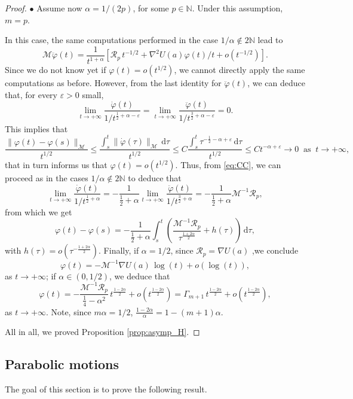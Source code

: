 \documentclass[a4paper,10pt]{amsart}
\newcommand{\ud}{\mathrm{d}}
\theoremstyle{plain}
\theoremstyle{definition}
\numberwithin{equation}{section}
\numberwithin{thm}{section}
\begin{document}
\begin{proof}
    \noindent $\bullet$  Assume now $\alpha =1/(2p)$, for some $p \in \mathbb{N}$. Under this assumption, $m=p$.

In this case, the same computations performed in the case $1/\alpha \notin 2 \mathbb{N}$ lead to
\begin{equation}
\label{eq:CC}
\mathcal M\ddot \varphi(t)=\frac{1}{t^{1+\alpha}}\left[\mathcal R_p\,t^{-1/2}+ \nabla^2 U(a)\varphi(t)/t + o(t^{-1/2})\right].
\end{equation}
Since we do not know yet if $\varphi(t)=o(t^{1/2})$, we cannot directly apply the same computations as before. However, from the last identity for $\ddot \varphi(t)$, we can deduce that, for every $\varepsilon>0$ small,
\[
\lim_{t \rightarrow+\infty} \frac{\dot \varphi(t)}{1/t^{\frac12+\alpha-\varepsilon}}=\lim_{t \rightarrow+\infty}\frac{\ddot \varphi(t)}{1/t^{\frac32+\alpha-\varepsilon}}=0.
\]
This implies that 
\[
\frac{\|\varphi(t)-\varphi(s)\|_\mathcal{M}}{t^{1/2}}\le \frac{\int_s^t \|\dot \varphi(\tau)\|_\mathcal{M}\,\ud\tau}{t^{1/2}} \le C \frac{\int_s^t \tau^{-\frac12-\alpha+\varepsilon}\,\ud\tau}{t^{1/2}}    \le C t^{-\alpha+\varepsilon} \to 0 \ \mbox{ as } \ t \rightarrow+\infty,
\]
that in turn informs us that $\varphi(t)=o(t^{1/2})$. Thus, from \eqref{eq:CC}, we can proceed as in the cases $1/\alpha \notin 2\mathbb N$ to deduce that
\[
\lim_{t \rightarrow+\infty}\frac{\dot \varphi(t)}{1/t^{\frac12+\alpha}}=-\frac1{\frac12 +\alpha}\lim_{t \rightarrow+\infty}\frac{\ddot \varphi(t)}{1/t^{\frac32+\alpha}}=-\frac1{\frac12+\alpha}\mathcal M^{-1}\mathcal R_p,
\]
from which we get
\[
\varphi(t)-\varphi(s)=-\frac1{\frac12+\alpha}\int_s^t \left(\frac{\mathcal M^{-1}\mathcal R_p}{\tau^{\frac{1+2\alpha}{2}}}+h(\tau)\right)\,\ud\tau,
\]
with $h(\tau)=o(\tau^{-\frac{1+2\alpha}{2}})$. Finally, if $\alpha=1/2$, since $\mathcal R_p=\nabla U(a)$ ,we conclude 
\[
\varphi(t)=-\mathcal M^{-1} \mathcal \nabla U(a) \, \log(t)+o(\log(t)),
\]
as $t\rightarrow+\infty$; if $\alpha \in (0,1/2)$, we deduce that
\[
\varphi(t)=-\frac{\mathcal M^{-1}\mathcal R_p}{\frac14 - \alpha^2}\,t^{\frac{1-2\alpha}{2}}+o\left(t^{\frac{1-2\alpha}{2}}\right)=\Gamma_{m+1}\,t^{\frac{1-2\alpha}{2}}+o\left(t^{\frac{1-2\alpha}{2}}\right),
\]
as $t \rightarrow+\infty$. Note, since $m\alpha=1/2$, $\frac{1-2\alpha}{\alpha}=1-(m+1)\alpha$.


 All in all, we proved Proposition \ref{prop:asymp_H}.
\end{proof}



\subsection{Parabolic motions}
The goal of this section is to prove the following result.
\end{document}
